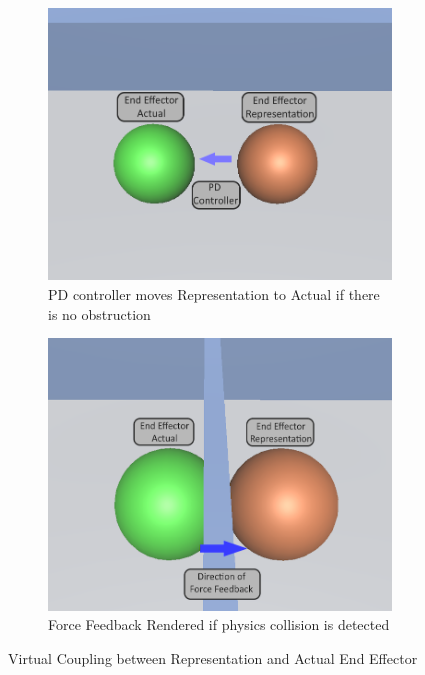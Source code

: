 \begin{figure}[htbp]
    \centering
    \begin{subfigure}[b]{0.4\textwidth}
        \centering
        \includegraphics[width=\textwidth]{images/approach-virtual-coupling-a.png}
        \caption{PD controller moves Representation to Actual if there is no obstruction}
        \label{fig:virtual-coupling-a}
    \end{subfigure}
    \quad
    \quad
    \begin{subfigure}[b]{0.4\textwidth}
        \centering
        \includegraphics[width=\textwidth]{images/approach-virtual-coupling-b.png}
        \caption{Force Feedback Rendered if physics collision is detected}
        \label{fig:virtual-coupling-b}
    \end{subfigure}
    \caption{Virtual Coupling between Representation and Actual End Effector}
    \label{fig:virtual-coupling}
\end{figure}

